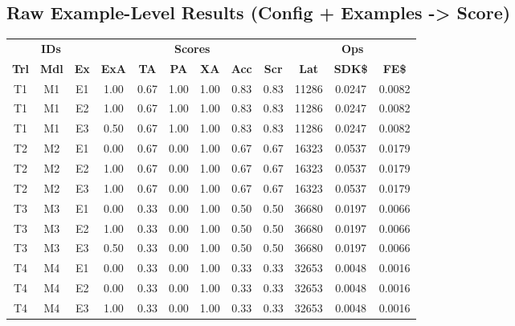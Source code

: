 \documentclass[11pt]{article}
\newcommand{\good}[1]{\cellcolor{ScaleGood}#1}
\newcommand{\midv}[1]{\cellcolor{ScaleMid}#1}
\newcommand{\bad}[1]{\cellcolor{ScaleBad}#1}
\begin{document}
\subsection{Raw Example-Level Results (Config + Examples -> Score)}

\scriptsize
\setlength{\tabcolsep}{3.2pt}
\begin{table}[H]
\centering
\begin{tabular}{cccccccccccc}
\toprule
\multicolumn{3}{c}{\textbf{IDs}} & \multicolumn{6}{c}{\textbf{Scores}} & \multicolumn{3}{c}{\textbf{Ops}} \\
\cmidrule(lr){1-3}\cmidrule(lr){4-9}\cmidrule(lr){10-12}
\textbf{Trl} & \textbf{Mdl} & \textbf{Ex} & \textbf{ExA} & \textbf{TA} & \textbf{PA} & \textbf{XA} & \textbf{Acc} & \textbf{Scr} & \textbf{Lat} & \textbf{SDK\$} & \textbf{FE\$} \\
\midrule
T1 & M1 & E1 & \good{1.00} & \midv{0.67} & \good{1.00} & \good{1.00} & \good{0.83} & \good{0.83} & \good{11286} & \midv{0.0247} & \midv{0.0082} \\
T1 & M1 & E2 & \good{1.00} & \midv{0.67} & \good{1.00} & \good{1.00} & \good{0.83} & \good{0.83} & \good{11286} & \midv{0.0247} & \midv{0.0082} \\
T1 & M1 & E3 & \midv{0.50} & \midv{0.67} & \good{1.00} & \good{1.00} & \good{0.83} & \good{0.83} & \good{11286} & \midv{0.0247} & \midv{0.0082} \\
T2 & M2 & E1 & \bad{0.00} & \midv{0.67} & \bad{0.00} & \good{1.00} & \midv{0.67} & \midv{0.67} & \midv{16323} & \bad{0.0537} & \bad{0.0179} \\
T2 & M2 & E2 & \good{1.00} & \midv{0.67} & \bad{0.00} & \good{1.00} & \midv{0.67} & \midv{0.67} & \midv{16323} & \bad{0.0537} & \bad{0.0179} \\
T2 & M2 & E3 & \good{1.00} & \midv{0.67} & \bad{0.00} & \good{1.00} & \midv{0.67} & \midv{0.67} & \midv{16323} & \bad{0.0537} & \bad{0.0179} \\
T3 & M3 & E1 & \bad{0.00} & \bad{0.33} & \bad{0.00} & \good{1.00} & \midv{0.50} & \midv{0.50} & \bad{36680} & \midv{0.0197} & \midv{0.0066} \\
T3 & M3 & E2 & \good{1.00} & \bad{0.33} & \bad{0.00} & \good{1.00} & \midv{0.50} & \midv{0.50} & \bad{36680} & \midv{0.0197} & \midv{0.0066} \\
T3 & M3 & E3 & \midv{0.50} & \bad{0.33} & \bad{0.00} & \good{1.00} & \midv{0.50} & \midv{0.50} & \bad{36680} & \midv{0.0197} & \midv{0.0066} \\
T4 & M4 & E1 & \bad{0.00} & \bad{0.33} & \bad{0.00} & \good{1.00} & \bad{0.33} & \bad{0.33} & \bad{32653} & \good{0.0048} & \good{0.0016} \\
T4 & M4 & E2 & \bad{0.00} & \bad{0.33} & \bad{0.00} & \good{1.00} & \bad{0.33} & \bad{0.33} & \bad{32653} & \good{0.0048} & \good{0.0016} \\
T4 & M4 & E3 & \good{1.00} & \bad{0.33} & \bad{0.00} & \good{1.00} & \bad{0.33} & \bad{0.33} & \bad{32653} & \good{0.0048} & \good{0.0016} \\
\bottomrule
\end{tabular}
\end{table}
\end{document}
